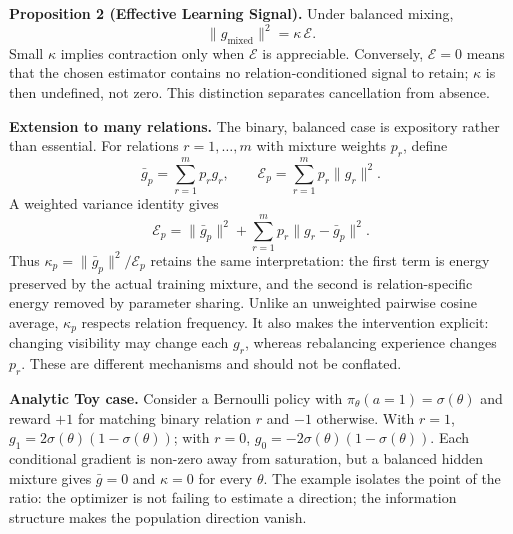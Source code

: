 \documentclass[letterpaper]{article}
\begin{document}
\medskip
\noindent\textbf{Proposition 2 (Effective Learning Signal).}
Under balanced mixing,
\begin{equation}
\|g_{\mathrm{mixed}}\|^2
=
\kappa\,\mathcal{E}.
\label{eq:effective}
\end{equation}
Small $\kappa$ implies contraction only when $\mathcal{E}$ is appreciable.
Conversely, $\mathcal{E}=0$ means that the chosen estimator contains no relation-conditioned signal to retain; $\kappa$ is then undefined, not zero.
This distinction separates cancellation from absence.

\medskip
\noindent\textbf{Extension to many relations.}
The binary, balanced case is expository rather than essential.
For relations $r=1,\ldots,m$ with mixture weights $p_r$, define
\begin{equation}
\bar g_p=\sum_{r=1}^{m}p_rg_r,
\qquad
\mathcal{E}_p=\sum_{r=1}^{m}p_r\|g_r\|^2.
\label{eq:weighted}
\end{equation}
A weighted variance identity gives
\begin{equation}
\mathcal{E}_p
=
\|\bar g_p\|^2
+
\sum_{r=1}^{m}p_r\|g_r-\bar g_p\|^2.
\label{eq:weighted-decomp}
\end{equation}
Thus $\kappa_p=\|\bar g_p\|^2/\mathcal{E}_p$ retains the same interpretation:
the first term is energy preserved by the actual training mixture, and the second is relation-specific energy removed by parameter sharing.
Unlike an unweighted pairwise cosine average, $\kappa_p$ respects relation frequency.
It also makes the intervention explicit: changing visibility may change each $g_r$, whereas rebalancing experience changes $p_r$.
These are different mechanisms and should not be conflated.

\medskip
\noindent\textbf{Analytic Toy case.}
Consider a Bernoulli policy with $\pi_\theta(a=1)=\sigma(\theta)$ and reward $+1$ for matching binary relation $r$ and $-1$ otherwise.
With $r=1$,
$g_1=2\sigma(\theta)(1-\sigma(\theta))$; with $r=0$,
$g_0=-2\sigma(\theta)(1-\sigma(\theta))$.
Each conditional gradient is non-zero away from saturation, but a balanced hidden mixture gives $\bar g=0$ and $\kappa=0$ for every $\theta$.
The example isolates the point of the ratio: the optimizer is not failing to estimate a direction; the information structure makes the population direction vanish.
\end{document}

